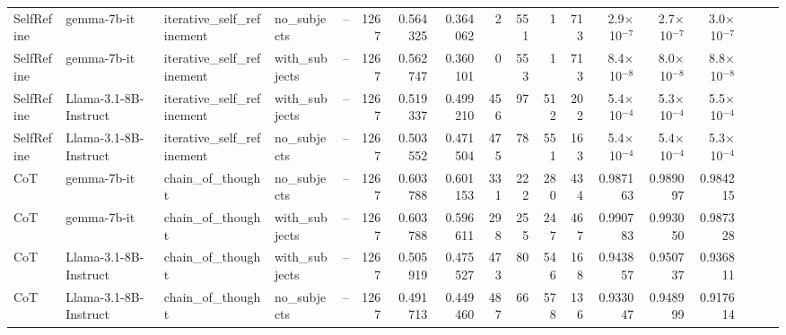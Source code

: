 \begin{landscape}
\begin{longtable}{l P{2.9cm} P{4cm} l P{2.2cm} r r r r r r r r r r r r r}
\midrule
SelfRefine & gemma-7b-it & iterative\_self\_refinement & no\_subjects & -- & 1267 & 0.564325 & 0.364062 & 2 & 551 & 1 & 713 & 2.9$\times$10$^{-7}$ & 2.7$\times$10$^{-7}$ & 3.0$\times$10$^{-7}$\\
SelfRefine & gemma-7b-it & iterative\_self\_refinement & with\_subjects & -- & 1267 & 0.562747 & 0.360101 & 0 & 553 & 1 & 713 & 8.4$\times$10$^{-8}$ & 8.0$\times$10$^{-8}$ & 8.8$\times$10$^{-8}$\\
SelfRefine & Llama-3.1-8B-Instruct & iterative\_self\_refinement & with\_subjects & -- & 1267 & 0.519337 & 0.499210 & 456 & 97 & 512 & 202 & 5.4$\times$10$^{-4}$ & 5.3$\times$10$^{-4}$ & 5.5$\times$10$^{-4}$\\
SelfRefine & Llama-3.1-8B-Instruct & iterative\_self\_refinement & no\_subjects & -- & 1267 & 0.503552 & 0.471504 & 475 & 78 & 551 & 163 & 5.4$\times$10$^{-4}$ & 5.4$\times$10$^{-4}$ & 5.3$\times$10$^{-4}$\\

\midrule
CoT & gemma-7b-it & chain\_of\_thought & no\_subjects & -- & 1267 & 0.603788 & 0.601153 & 331 & 222 & 280 & 434 & 0.987163 & 0.989097 & 0.984215\\
CoT & gemma-7b-it & chain\_of\_thought & with\_subjects & -- & 1267 & 0.603788 & 0.596611 & 298 & 255 & 247 & 467 & 0.990783 & 0.993050 & 0.987328\\
CoT & Llama-3.1-8B-Instruct & chain\_of\_thought & with\_subjects & -- & 1267 & 0.505919 & 0.475527 & 473 & 80 & 546 & 168 & 0.943857 & 0.950737 & 0.936811\\
CoT & Llama-3.1-8B-Instruct & chain\_of\_thought & no\_subjects & -- & 1267 & 0.491713 & 0.449460 & 487 & 66 & 578 & 136 & 0.933047 & 0.948999 & 0.917614\\


\end{longtable}
\end{landscape}
